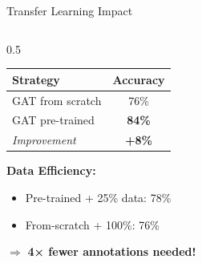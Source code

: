 \documentclass[aspectratio=169]{beamer}
\begin{document}
\begin{frame}{Transfer Learning Impact}
    \begin{columns}
        \begin{column}{0.5\textwidth}
    \begin{table}
        \centering
        \begin{tabular}{lc}
            \toprule
                    \textbf{Strategy} & \textbf{Accuracy} \\
            \midrule
                    GAT from scratch & 76\% \\
                    GAT pre-trained & \textbf{84\%} \\
            \midrule
            \textit{Improvement} & \textbf{+8\%} \\
            \bottomrule
        \end{tabular}
    \end{table}
    
            \vspace{0.5em}
    \textbf{Data Efficiency:}
    \begin{itemize}
                \item Pre-trained + 25\% data: 78\%
                \item From-scratch + 100\%: 76\%
    \end{itemize}
    
            $\Rightarrow$ \textbf{4× fewer annotations needed!}
        \end{column}
    \end{columns}
\end{frame}
\end{document}
